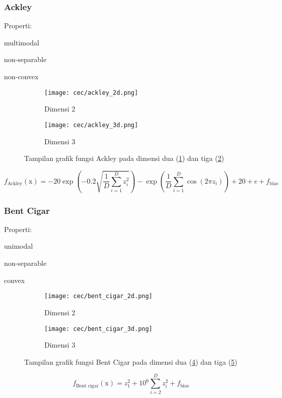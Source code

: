 \subsubsection*{Ackley}
\noindent Properti:
\begin{packed_item}
  \item multimodal
  \item non-separable
  \item non-convex
\end{packed_item}
\begin{figure}[H]
	\centering
	\begin{subfigure}[b]{0.4\textwidth}
		\centering
		\texttt{[image: cec/ackley\_2d.png]}
		\caption{Dimensi 2}
		\label{fig:ackley-2d}
	\end{subfigure}
	\hfill
	\begin{subfigure}[b]{0.4\textwidth}
		\centering
		\texttt{[image: cec/ackley\_3d.png]}
		\caption{Dimensi 3}
		\label{fig:ackley-3d}
	\end{subfigure}
	\caption{Tampilan grafik fungsi Ackley pada dimensi dua (\cref{fig:ackley-2d}) dan tiga (\cref{fig:ackley-3d})}
	\label{fig:ackley}
\end{figure}
\begin{equation}
  f_{\text{Ackley}}(\mathrm{x})=-20\exp\left(-0.2\sqrt{\frac{1}{D}\sum_{i=1}^{D}z_i^2} \right)-\exp\left( \frac{1}{D}\sum_{i=1}^{D}\cos\left(2\pi z_i \right) \right) + 20 + e +f_{\text{bias}}
\end{equation}

\subsubsection*{Bent Cigar}
\noindent Properti:
\begin{packed_item}
  \item unimodal
  \item non-separable
  \item convex
\end{packed_item}
\begin{figure}[H]
	\centering
	\begin{subfigure}[b]{0.4\textwidth}
		\centering
		\texttt{[image: cec/bent\_cigar\_2d.png]}
		\caption{Dimensi 2}
		\label{fig:bentcigar-2d}
	\end{subfigure}
	\hfill
	\begin{subfigure}[b]{0.4\textwidth}
		\centering
		\texttt{[image: cec/bent\_cigar\_3d.png]}
		\caption{Dimensi 3}
		\label{fig:bentcigar-3d}
	\end{subfigure}
	\caption{Tampilan grafik fungsi Bent Cigar pada dimensi dua (\cref{fig:bentcigar-2d}) dan tiga (\cref{fig:bentcigar-3d})}
	\label{fig:bentcigar}
\end{figure}
\begin{equation}
  f_{\text{Bent cigar}}(\mathrm{x})=z_1^2+10^6\sum_{i=2}^{D}z_i^2+f_{\text{bias}}
\end{equation}


